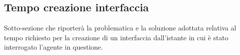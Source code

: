\subsection{Tempo creazione interfaccia}

Sotto-sezione che riporterà la problematica e la soluzione adottata relativa al tempo richiesto per la creazione di un interfaccia dall'istante in cui è stato interrogato l'agente in questione.
